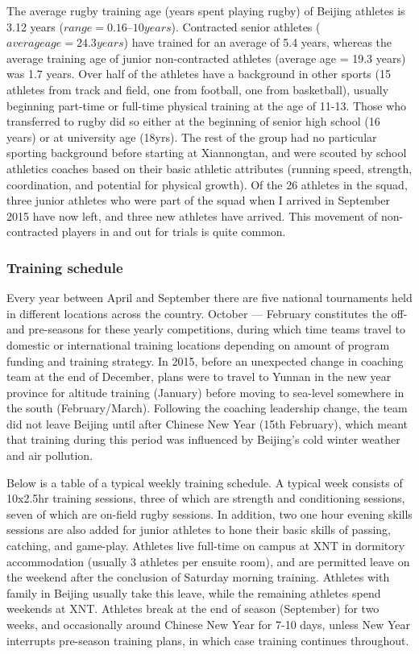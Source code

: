 The average rugby training age (years spent playing rugby) of Beijing athletes is 3.12 years ($range = 0.16 – 10 years$).  Contracted senior athletes ($average age = 24.3 years$) have trained for an average of 5.4 years, whereas the average training age of junior non-contracted athletes (average age = 19.3 years) was 1.7 years.  Over half of the athletes have a background in other sports (15 athletes from track and field, one from football, one from basketball), usually beginning part-time or full-time physical training at the age of 11-13.  Those who transferred to rugby did so either at the beginning of senior high school (16 years) or at university age (18yrs).  The rest of the group had no particular sporting background before starting at Xiannongtan, and were scouted by school athletics coaches based on their basic athletic attributes (running speed, strength, coordination, and potential for physical growth).  Of the 26 athletes in the squad, three junior athletes who were part of the squad when I arrived in September 2015 have now left, and three new athletes have arrived. This movement of non-contracted players in and out for trials is quite common.

\subsubsection{Training schedule}
Every year between April and September there are five national tournaments held in different locations across the country.  October –-- February constitutes the off- and pre-seasons for these yearly competitions, during which time teams travel to domestic or international training locations depending on amount of program funding and training strategy.  In 2015, before an unexpected change in coaching team at the end of December, plans were to travel to Yunnan in the new year province for altitude training (January) before moving to sea-level somewhere in the south (February/March).  Following the coaching leadership change, the team did not leave Beijing until after Chinese New Year (15th February), which meant that training during this period was influenced by Beijing's cold winter weather and air pollution.

Below is a table of a typical weekly training schedule. A typical week consists of 10x2.5hr training sessions, three of which are strength and conditioning sessions, seven of which are on-field rugby sessions.  In addition, two one hour evening skills sessions are also added for junior athletes to hone their basic skills of passing, catching, and game-play.  Athletes live full-time on campus at XNT in dormitory accommodation (usually 3 athletes per ensuite room), and are permitted leave on the weekend after the conclusion of Saturday morning training.  Athletes with family in Beijing usually take this leave, while the remaining athletes spend weekends at XNT.  Athletes break at the end of season (September) for two weeks, and occasionally around Chinese New Year for 7-10 days, unless New Year interrupts pre-season training plans, in which case training continues throughout.


